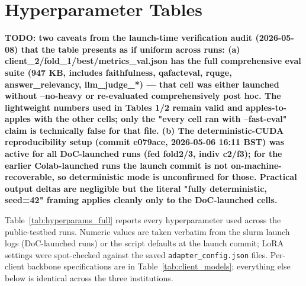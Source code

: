 \documentclass[11pt]{article}
\theoremstyle{plain}
\theoremstyle{definition}
\theoremstyle{remark}
\newcommand{\red}[1]{\textcolor{myred}{\textbf{#1}}}
\begin{document}
\section{Hyperparameter Tables}
\label{app:hyperparams}

\red{TODO: two caveats from the launch-time verification audit (2026-05-08) that the table presents as if uniform across runs:   (a) client\_2/fold\_1/best/metrics\_val.json has the full       comprehensive eval suite (947 KB, includes faithfulness,       qafacteval, rquge, answer\_relevancy, llm\_judge\_*) — that       cell was either launched without --no-heavy or re-evaluated       comprehensively post hoc. The lightweight numbers used in       Tables 1/2 remain valid and apples-to-apples with the other       cells; only the "every cell ran with --fast-eval" claim is       technically false for that file.   (b) The deterministic-CUDA reproducibility setup (commit e079ace,       2026-05-06 16:11 BST) was active for all DoC-launched runs       (fed fold2/3, indiv c2/f3); for the earlier Colab-launched       runs the launch commit is not on-machine-recoverable, so       deterministic mode is unconfirmed for those. Practical       output deltas are negligible but the literal "fully       deterministic, seed=42" framing applies cleanly only to the       DoC-launched cells.}

Table~\ref{tab:hyperparams_full} reports every
hyperparameter used across the public-testbed runs.
Numeric values are taken verbatim from the slurm
launch logs (DoC-launched runs) or the script
defaults at the launch commit; LoRA settings were
spot-checked against the saved
\texttt{adapter\_config.json} files. Per-client
backbone specifications are in
Table~\ref{tab:client_models}; everything else
below is identical across the three institutions.
\end{document}
